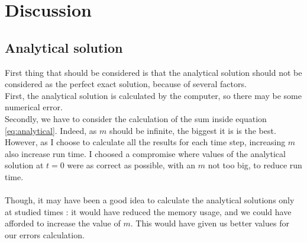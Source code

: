 \documentclass{article}
\begin{document}
    
        \newpage
        \section{Discussion}
            \subsection{Analytical solution}
                First thing that should be considered is that the analytical solution should not be
                considered as the perfect exact solution, because of several factors.
                \\
                First, the analytical solution is calculated by the computer, so there may be some numerical error.
                \\
                Secondly, we have to consider the calculation of the sum inside equation \eqref{eq:analytical}.
                Indeed, as $m$ should be infinite, the biggest it is is the best. However, as I choose to calculate
                all the results for each time step, increasing $m$ also increase run time. I choosed a compromise
                where values of the analytical solution at $t=0$ were as correct as possible, with an $m$ not too big,
                to reduce run time.
                \\
                \\
                Though, it may have been a good idea to calculate the analytical solutions only at studied times : 
                it would have reduced the memory usage, and we could have afforded to increase the value of $m$.
                This would have given us better values for our errors calculation.
    
\end{document}

